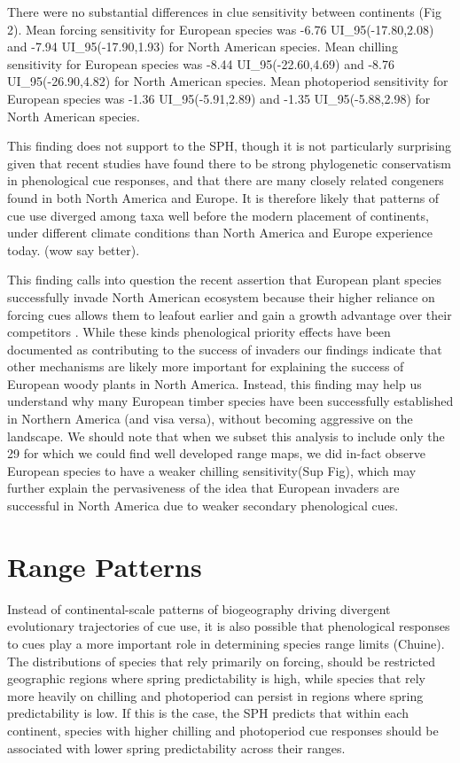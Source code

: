 \documentclass[12pt]{article}
\begin{document}
There were no substantial differences in clue sensitivity between continents (Fig 2). Mean forcing sensitivity for European species was -6.76 UI_{95}(-17.80,2.08)  and -7.94 UI_{95}(-17.90,1.93) for North American species. Mean chilling sensitivity for European species was -8.44 UI_{95}(-22.60,4.69) and -8.76 UI_{95}(-26.90,4.82) for North American species. Mean photoperiod sensitivity for European species was -1.36 UI_{95}(-5.91,2.89) and -1.35 UI_{95}(-5.88,2.98) for North American species.

This finding does not support to the SPH, though it is not particularly surprising given that recent studies have found there to be strong phylogenetic conservatism in phenological cue responses, and that there are many closely related congeners found in both North America and Europe. It is therefore likely that patterns of cue use diverged among taxa well before the modern placement of continents, under different climate conditions than North America and Europe experience today. (wow say better).  

This finding calls into question the recent assertion that European plant species successfully invade North American ecosystem because their higher reliance on forcing cues allows them to leafout earlier and gain a growth advantage over their competitors \citep{Dawson2025}. While these kinds phenological priority effects have been documented as contributing to the success of invaders \citep{Buonaiuto:2023wy,Alexander2019} our findings indicate that other mechanisms are likely more important for explaining the success of European woody plants in North America. Instead, this finding may help us understand why many European timber species have been successfully established in Northern America (and visa versa), without becoming aggressive on the landscape. We should note that when we subset this analysis to include only the 29 for which we could find well developed range maps, we did in-fact observe European species to have a weaker chilling sensitivity(Sup Fig), which may further explain the pervasiveness of the idea that European invaders are successful in North America due to weaker secondary phenological cues.

\section*{Range Patterns}
Instead of continental-scale patterns of biogeography driving divergent evolutionary trajectories of cue use, it is also possible that phenological responses to cues play a more important role in determining species range limits (Chuine). The distributions of species that rely primarily on forcing, should be restricted geographic regions where spring predictability is high, while species that rely more heavily on chilling and photoperiod can persist in regions where spring predictability is low. If this is the case, the SPH predicts that within each continent, species with higher chilling and photoperiod cue responses should be associated with lower spring predictability across their ranges.
\end{document}
